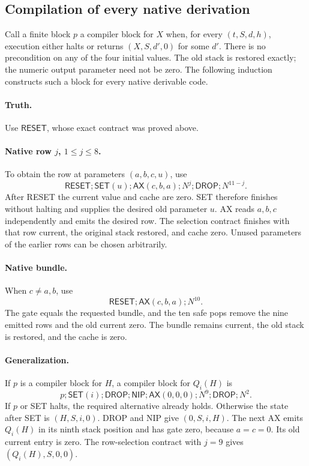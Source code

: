 \subsection{Compilation of every native derivation}

Call a finite block $p$ a compiler block for $X$ when, for every
$(t,S,d,h)$, execution either halts or returns $(X,S,d',0)$ for some
$d'$.  There is no precondition on any of the four initial values.
The old stack is restored exactly; the numeric output parameter need not
be zero.  The following induction constructs such a block for every native
derivable code.

\paragraph{Truth.}
Use $\mathsf{RESET}$, whose exact contract was proved above.

\paragraph{Native row $j$, $1\le j\le8$.}
To obtain the row at parameters $(a,b,c,u)$, use
\[
 \mathsf{RESET};\mathsf{SET}(u);\mathsf{AX}(c,b,a);
 N^j;\mathsf{DROP};N^{11-j}.
\]
After RESET the current value and cache are zero.  SET therefore finishes
without halting and supplies the desired old parameter $u$.  AX reads
$a,b,c$ independently and emits the desired row.  The selection contract
finishes with that row current, the original stack restored, and cache zero.
Unused parameters of the earlier rows can be chosen arbitrarily.

\paragraph{Native bundle.}
When $c\ne a,b$, use
\[
 \mathsf{RESET};\mathsf{AX}(c,b,a);N^{10}.
\]
The gate equals the requested bundle, and the ten safe pops remove the
nine emitted rows and the old current zero.  The bundle remains current,
the old stack is restored, and the cache is zero.

\paragraph{Generalization.}
If $p$ is a compiler block for $H$, a compiler block for $Q_i(H)$ is
\[
 p;\mathsf{SET}(i);\mathsf{DROP};\mathsf{NIP};
 \mathsf{AX}(0,0,0);N^9;\mathsf{DROP};N^2.
\]
If $p$ or SET halts, the required alternative already holds.  Otherwise the
state after SET is $(H,S,i,0)$.  DROP and NIP give $(0,S,i,H)$.
The next AX emits $Q_i(H)$ in its ninth stack position and has gate zero,
because $a=c=0$.  Its old current entry is zero.  The row-selection contract
with $j=9$ gives $(Q_i(H),S,0,0)$.

